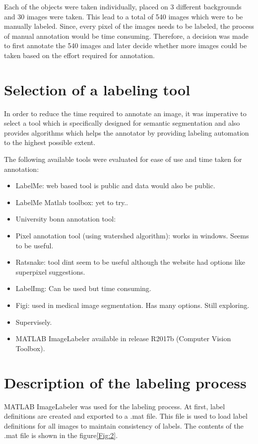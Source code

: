 \documentclass[paper=a4,11pt,parskip=half,toc=listof]{scrartcl}
\begin{document}
Each of the objects were taken individually, placed on 3 different backgrounds and 30 images were taken. This lead to a total of 540 images which were to be manually labeled. Since, every pixel of the images needs to be labeled, the process of manual annotation would be time consuming. Therefore, a decision was made to first annotate the 540 images and later decide whether more images could be taken based on the effort required for annotation.

\section{Selection of a labeling tool}
In order to reduce the time required to annotate an image, it was imperative to select a tool which is specifically designed for semantic segmentation and also provides algorithms which helps the annotator by providing labeling automation to the highest possible extent.

The following available tools were evaluated for ease of use and time taken for annotation:
	\begin{itemize}
		\item LabelMe: web based tool is public and data would also be public.
		\item LabelMe Matlab toolbox: yet to try..
		\item University bonn annotation tool:
		\item Pixel annotation tool (using watershed algorithm): works in windows. Seems to be useful.
		\item Ratsnake: tool dint seem to be useful although the website had options like superpixel suggestions.
		\item LabelImg: Can be used but time consuming.
		\item Figi: used in medical image segmentation. Has many options. Still exploring.
		\item Supervisely.
		\item MATLAB ImageLabeler available in release R2017b (Computer Vision Toolbox).
	\end{itemize}

\section{Description of the labeling process}
\label{section:process}
MATLAB ImageLabeler was used for the labeling process. At first, label definitions are created and exported to a .mat file. This file is used to load label definitions for all images to maintain consistency of labels. The contents of the .mat file is shown in the figure\ref{Fig:2}.
\end{document}
